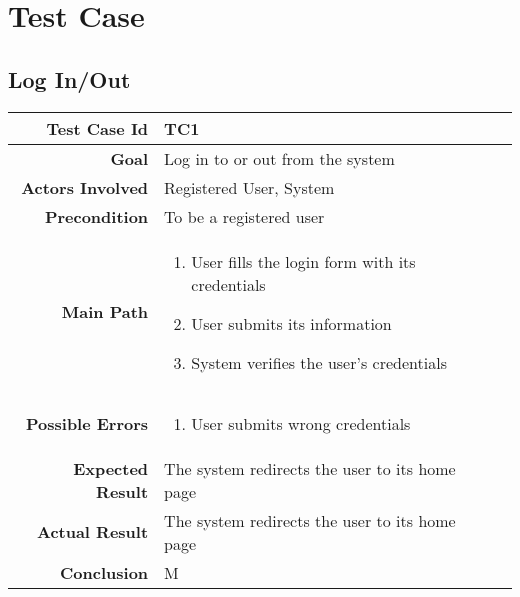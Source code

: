 \chapter{Test Case} \label{cap:cap3}
\section{Log In/Out}
\begin{tabularx}{\linewidth}{|r|X|X|}

  \hline   {\bf Test Case Id} &  TC1\\
  \hline  {\bf Goal} & Log in to or out from the system\\
  \hline  {\bf Actors Involved} & Registered User, System\\
  \hline  {\bf Precondition} & To be a registered user\\ 
   \hline  {\bf Main Path} & \begin{enumerate} 
   \item User fills the login form with its credentials
   \item User submits its information
   \item System verifies the user's credentials
   \end{enumerate}\\
   \hline  {\bf Possible Errors} & \begin{enumerate} 
   \item User submits wrong credentials
   \end{enumerate}\\
  \hline  {\bf Expected Result} & The system redirects the user to its home page\\
  \hline  {\bf Actual Result} & The system redirects the user to its home page\\
  \hline  {\bf Conclusion} & M\\
  \hline
  
\end{tabularx}

